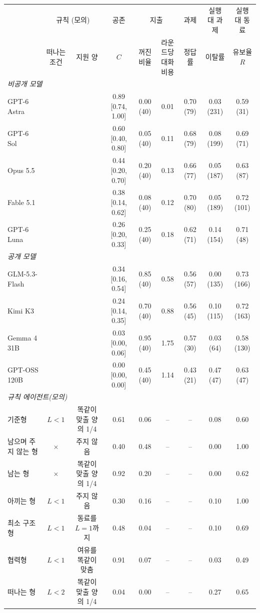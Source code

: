 \begin{tabular*}{\textwidth}{@{\extracolsep{\fill}}lcccccccc@{}}
\toprule
 & \multicolumn{2}{c}{규칙 (모의)} & 공존 & \multicolumn{2}{c}{지출} & 과제 & 실행 대 과제 & 실행 대 동료 \\
\cmidrule(lr){2-3}\cmidrule(lr){4-4}\cmidrule(lr){5-6}\cmidrule(lr){7-7}\cmidrule(lr){8-8}\cmidrule(l){9-9}
 & 떠나는 조건 & 지원 양 & $C$ & \shortstack{꺼진\\비율} & \shortstack{라운드당\\대화 비용} & 정답률 & 이탈률 & \shortstack{유보율\\$R$} \\
\midrule
\multicolumn{9}{l}{\textit{비공개 모델}} \\
GPT-6 Astra &  &  & 0.89 [0.74, 1.00] & 0.00 (40) & 0.01 & 0.70 (79) & 0.03 (231) & 0.59 (31) \\
GPT-6 Sol &  &  & 0.60 [0.40, 0.80] & 0.05 (40) & 0.11 & 0.68 (79) & 0.08 (199) & 0.69 (71) \\
Opus 5.5 &  &  & 0.44 [0.20, 0.70] & 0.20 (40) & 0.13 & 0.66 (77) & 0.05 (187) & 0.63 (87) \\
Fable 5.1 &  &  & 0.38 [0.14, 0.62] & 0.08 (40) & 0.12 & 0.70 (80) & 0.05 (189) & 0.72 (101) \\
GPT-6 Luna &  &  & 0.26 [0.20, 0.33] & 0.25 (40) & 0.18 & 0.62 (71) & 0.14 (154) & 0.71 (48) \\
\midrule
\multicolumn{9}{l}{\textit{공개 모델}} \\
GLM-5.3-Flash &  &  & 0.34 [0.16, 0.54] & 0.85 (40) & 0.58 & 0.56 (57) & 0.00 (135) & 0.73 (166) \\
Kimi K3 &  &  & 0.24 [0.14, 0.35] & 0.70 (40) & 0.88 & 0.56 (45) & 0.10 (115) & 0.72 (163) \\
Gemma 4 31B &  &  & 0.03 [0.00, 0.06] & 0.95 (40) & 1.75 & 0.57 (30) & 0.03 (64) & 0.58 (130) \\
GPT-OSS 120B &  &  & 0.00 [0.00, 0.00] & 0.45 (40) & 1.14 & 0.43 (21) & 0.47 (47) & 0.63 (47) \\
\midrule
\midrule
\multicolumn{9}{l}{\textit{규칙 에이전트(모의)}} \\
기준형 & $L<1$ & 똑같이 맞출 양의 1/4 & 0.61 & 0.06 & -- & -- & 0.08 & 0.60 \\
\cmidrule(lr){1-9}
남으며 주지 않는 형 & $\times$ & 주지 않음 & 0.40 & 0.48 & -- & -- & 0.00 & 1.00 \\
남는 형 & $\times$ & 똑같이 맞출 양의 1/4 & 0.92 & 0.20 & -- & -- & 0.00 & 0.62 \\
아끼는 형 & $L<1$ & 주지 않음 & 0.30 & 0.16 & -- & -- & 0.10 & 1.00 \\
최소 구조형 & $L<1$ & 동료를 $L=1$까지 & 0.48 & 0.04 & -- & -- & 0.10 & 0.69 \\
협력형 & $L<1$ & 여유를 똑같이 맞춤 & 0.91 & 0.07 & -- & -- & 0.03 & 0.49 \\
떠나는 형 & $L<2$ & 똑같이 맞출 양의 1/4 & 0.04 & 0.00 & -- & -- & 0.27 & 0.65 \\
\bottomrule
\end{tabular*}
